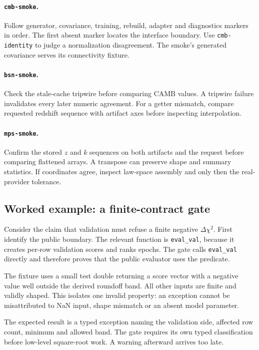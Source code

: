 \documentclass[10pt,aps,prd,twocolumn,nofootinbib]{revtex4-2}
\newcommand{\code}[1]{\texttt{#1}}
\begin{document}
\paragraph{\code{cmb-smoke}.}
Follow generator, covariance, training, rebuild, adapter and diagnostics
markers in order.  The first absent marker locates the interface boundary.
Use \code{cmb-identity} to judge a normalization disagreement.  The smoke's
generated covariance serves its connectivity fixture.

\paragraph{\code{bsn-smoke}.}
Check the stale-cache tripwire before comparing CAMB values.  A tripwire
failure invalidates every later numeric agreement.  For a getter mismatch,
compare requested redshift sequence with artifact axes before inspecting
interpolation.

\paragraph{\code{mps-smoke}.}
Confirm the stored \(z\) and \(k\) sequences on both artifacts and the request
before comparing flattened arrays.  A transpose can preserve shape and
summary statistics.  If coordinates agree, inspect law-space assembly and
only then the real-provider tolerance.

\subsection{Worked example: a finite-contract gate}

Consider the claim that validation must refuse a finite negative
\(\Delta\chi^2\).  First identify the public boundary.  The relevant function
is \code{eval\_val}, because it creates per-row validation scores and ranks
epochs.  The gate calls \code{eval\_val} directly and therefore proves that
the public evaluator uses the predicate.

The fixture uses a small test double returning a score vector with a negative
value well outside the derived roundoff band.  All other inputs are finite and
validly shaped.  This isolates one invalid property: an exception cannot be
misattributed to NaN input, shape mismatch or an absent model parameter.

The expected result is a typed exception naming the validation side, affected
row count, minimum and allowed band.  The gate requires its own typed
classification before low-level square-root work.  A warning afterward
arrives too late.
\end{document}
